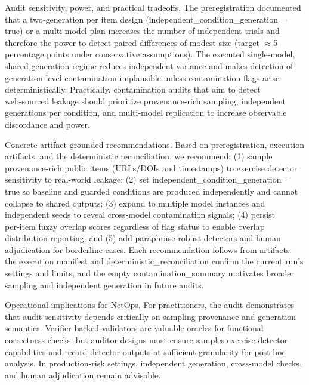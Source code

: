 \documentclass[conference]{IEEEtran}
\begin{document}
Audit sensitivity, power, and practical tradeoffs. The preregistration documented that a two‑generation per item design (independent\_condition\_generation = true) or a multi‑model plan increases the number of independent trials and therefore the power to detect paired differences of modest size (target \ensuremath{\approx}5 percentage points under conservative assumptions). The executed single‑model, shared‑generation regime reduces independent variance and makes detection of generation‑level contamination implausible unless contamination flags arise deterministically. Practically, contamination audits that aim to detect web‑sourced leakage should prioritize provenance‑rich sampling, independent generations per condition, and multi‑model replication to increase observable discordance and power.

Concrete artifact‑grounded recommendations. Based on preregistration, execution artifacts, and the deterministic reconciliation, we recommend: (1) sample provenance‑rich public items (URLs/DOIs and timestamps) to exercise detector sensitivity to real‑world leakage; (2) set independent\_condition\_generation = true so baseline and guarded conditions are produced independently and cannot collapse to shared outputs; (3) expand to multiple model instances and independent seeds to reveal cross‑model contamination signals; (4) persist per‑item fuzzy overlap scores regardless of flag status to enable overlap distribution reporting; and (5) add paraphrase‑robust detectors and human adjudication for borderline cases. Each recommendation follows from artifacts: the execution manifest and deterministic\_reconciliation confirm the current run's settings and limits, and the empty contamination\_summary motivates broader sampling and independent generation in future audits.

Operational implications for NetOps. For practitioners, the audit demonstrates that audit sensitivity depends critically on sampling provenance and generation semantics. Verifier‑backed validators are valuable oracles for functional correctness checks, but auditor designs must ensure samples exercise detector capabilities and record detector outputs at sufficient granularity for post‑hoc analysis. In production‑risk settings, independent generation, cross‑model checks, and human adjudication remain advisable.
\end{document}
